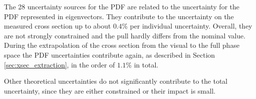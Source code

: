 
 The 28 uncertainty sources for the PDF are related to the uncertainty for the PDF represented in eigenvectors.
 They contribute to the uncertainty on the measured cross section up to about $0.4\%$ per individual uncertainty. Overall, they are not strongly constrained and the pull hardly differs from the nominal value.
 During the extrapolation of the cross section from the visual to the full phase space the PDF uncertainties contribute again, as described in Section \ref{sec:xsec_extraction}, in the order of $1.1  \%$ in total.

 Other theoretical uncertainties do not significantly contribute to the total uncertainty, since they are either constrained or their impact is small.





